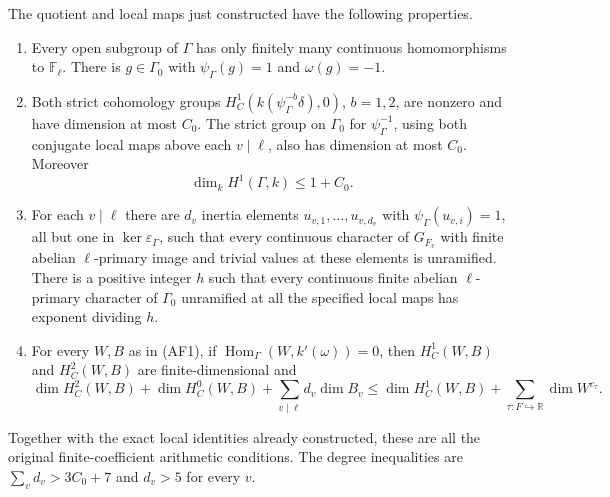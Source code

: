 \begin{theorem}
\label{thm:support-auxiliary-frame}
The quotient and local maps just constructed have the following
properties.
\begin{enumerate}
\item Every open subgroup of $\Gamma$ has only finitely many
  continuous homomorphisms to $\mathbb F_\ell$.
  There is $g\in\Gamma_0$ with
  $\psi_\Gamma(g)=1$ and $\omega(g)=-1$.
\item Both strict cohomology groups
  $H^1_C(k(\psi_\Gamma^{-b}\delta),0)$, $b=1,2$, are
  nonzero and have dimension at most $C_0$.
  The strict group on $\Gamma_0$ for $\psi_\Gamma^{-1}$,
  using both conjugate local maps above each $v\mid\ell$,
  also has dimension at most $C_0$.  Moreover
  \[
                    \dim_k H^1(\Gamma,k)\leq1+C_0.       \tag{AF2}
  \]
\item For each $v\mid\ell$ there are $d_v$ inertia elements
  $u_{v,1},\ldots,u_{v,d_v}$ with $\psi_\Gamma(u_{v,i})=1$,
  all but one in $\ker\varepsilon_\Gamma$, such that every
  continuous character of $G_{F_v}$ with finite abelian
  $\ell$-primary image and trivial values at these elements
  is unramified.  There is a positive integer $h$ such that
  every continuous finite abelian $\ell$-primary character
  of $\Gamma_0$ unramified at all the specified local maps
  has exponent dividing $h$.
\item For every $W,B$ as in (AF1), if
  $\operatorname{Hom}_{\Gamma}(W,k'(\omega))=0$, then
  $H^1_C(W,B)$ and $H^2_C(W,B)$ are finite-dimensional and
  \[
   \dim H^2_C(W,B)+\dim H^0_C(W,B)
        +\sum_{v\mid\ell}d_v\dim B_v
     \leq \dim H^1_C(W,B)+\sum_{\tau:F\hookrightarrow\mathbb R}
                                      \dim W^{c_\tau}.   \tag{AF3}
  \]
\end{enumerate}
Together with the exact local identities already constructed,
these are all the original finite-coefficient arithmetic
conditions.  The degree inequalities are
$\sum_vd_v>3C_0+7$ and $d_v>5$ for every $v$.
\end{theorem}

